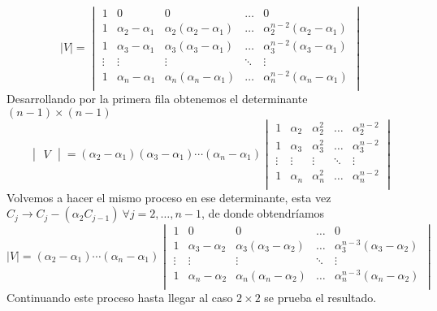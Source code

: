 \documentclass[twoside]{article}
\begin{document}
\begin{solucion}
\begin{enumerate}
\[
|V|=\begin{vmatrix}
1 & 0 & 0 & \dots & 0\\
1 & \alpha_2-\alpha_1 & \alpha_2(\alpha_2-\alpha_1) & \dots & \alpha_2^{n-2}(\alpha_2-\alpha_1)\\
1 & \alpha_3-\alpha_1 & \alpha_3(\alpha_3-\alpha_1) & \dots & \alpha_3^{n-2}(\alpha_3-\alpha_1)\\
\vdots & \vdots & \vdots & \ddots &\vdots \\
1 & \alpha_n-\alpha_1 & \alpha_n(\alpha_n-\alpha_1) & \dots & \alpha_n^{n-2}(\alpha_n-\alpha_1)\\
\end{vmatrix}
\]
Desarrollando por la primera fila obtenemos el determinante $(n-1)\times(n-1)$
\[
\begin{vmatrix} V \end{vmatrix}=
(\alpha_2-\alpha_1)(\alpha_3-\alpha_1)\cdots(\alpha_n-\alpha_1)
\begin{vmatrix}
1 & \alpha_2 & \alpha_2^2 & \dots & \alpha_2^{n-2}\\
1 & \alpha_3 & \alpha_3^2 & \dots & \alpha_3^{n-2}\\
\vdots & \vdots & \vdots &\ddots &\vdots \\
1 & \alpha_n & \alpha_n^2 & \dots & \alpha_n^{n-2}\\
\end{vmatrix}
\]
Volvemos a hacer el mismo proceso en ese determinante, esta vez $C_j\rightarrow C_j-(\alpha_2 C_{j-1})\ \forall j=2,\dots, n-1$, de donde obtendríamos
\[
|V|=(\alpha_2-\alpha_1)\cdots(\alpha_n-\alpha_1)\begin{vmatrix}
1 & 0 & 0 & \dots & 0\\
1 & \alpha_3-\alpha_2 & \alpha_3(\alpha_3-\alpha_2)& \dots & \alpha_3^{n-3}(\alpha_3-\alpha_2)\\
\vdots & \vdots & \vdots & \ddots&\vdots \\
1 & \alpha_n-\alpha_2 & \alpha_n(\alpha_n-\alpha_2) & \dots & \alpha_n^{n-3}(\alpha_n-\alpha_2)\\
\end{vmatrix}
\]
Continuando este proceso hasta llegar al caso $2\times 2$ se prueba el resultado.
\end{enumerate}
\end{solucion}
\newpage 
\end{document}
